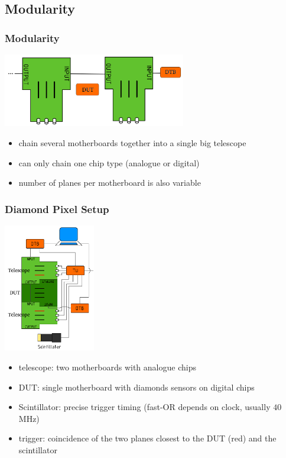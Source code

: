 \documentclass[9pt]{beamer}
\begin{document}
\subsection{Modularity}
\begin{frame}
	\frametitle{Modularity}
	\begin{center}
		\includegraphics[width=8cm]{Modul}
	\end{center}
	\begin{itemize}
		\item chain several motherboards together into a single big telescope
		\item can only chain one chip type (analogue or digital)
		\item number of planes per motherboard is also variable 
	\end{itemize}
\end{frame}
\begin{frame}
	\frametitle{Diamond Pixel Setup}
	\begin{minipage}{4cm}
		\centering
		\includegraphics[width=4cm]{fulltel_scint}
	\end{minipage}
	\hspace*{2pt}
	\begin{minipage}{7cm}
		\begin{itemize}
			\item telescope: two motherboards with analogue chips 
			\item DUT: single motherboard with diamonds sensors on digital chips
			\item Scintillator: precise trigger timing  (fast-OR depends on clock, usually $40$\,MHz)
			\item trigger: coincidence of the two planes closest to the DUT (red) and the scintillator
		\end{itemize}
	\end{minipage}
\end{frame}
\end{document}
